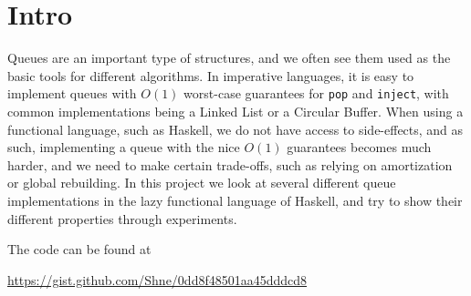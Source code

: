 \section{Intro}
Queues are an important type of structures, and we often see them used as the basic tools for different algorithms. In imperative languages, it is easy to implement queues with $O(1)$ worst-case guarantees for \texttt{pop} and \texttt{inject}, with common implementations being a Linked List or a Circular Buffer. When using a functional language, such as Haskell, we do not have access to side-effects, and as such, implementing a queue with the nice $O(1)$ guarantees becomes much harder, and we need to make certain trade-offs, such as relying on amortization or global rebuilding. In this project we look at several different queue implementations in the lazy functional language of Haskell, and try to show their different properties through experiments.

The code can be found at

\url{https://gist.github.com/Shne/0dd8f48501aa45dddcd8}